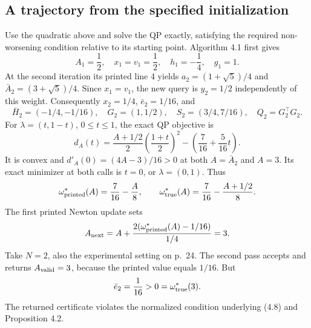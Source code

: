 \documentclass[10pt]{article}
\begin{document}
\subsection*{A trajectory from the specified initialization}
Use the quadratic above and solve the QP exactly, satisfying the required non-worsening condition relative to its starting point. Algorithm 4.1 first gives \[A_1=\frac12,\quad x_1=v_1=\frac12,\quad
 h_1=-\frac14,\quad g_1=1.\] At the second iteration its printed line 4 yields \(a_2=(1+\sqrt5)/4\) and \(\bar A_2=(3+\sqrt5)/4\). Since \(x_1=v_1\), the new query is \(y_2=1/2\) independently of this weight. Consequently \(x_2=1/4\), \(\bar e_2=1/16\), and \[\bar H_2=(-1/4,-1/16),\quad G_2=(1,1/2),\quad
 S_2=(3/4,7/16),\quad Q_2=G_2^\top G_2.\] For \(\lambda=(t,1-t)\), \(0\le t\le1\), the exact QP objective is \[d_A(t)=\frac{A+1/2}{2}\left(\frac{1+t}{2}\right)^2
            -\left(\frac7{16}+\frac5{16}t\right).\] It is convex and \(d'_A(0)=(4A-3)/16>0\) at both \(A=\bar A_2\) and \(A=3\). Its exact minimizer at both calls is \(t=0\), or \(\lambda=(0,1)\). Thus \[\omega_{\rm printed}^*(A)=\frac7{16}-\frac A8,\qquad
 \omega_{\rm true}^*(A)=\frac7{16}-\frac{A+1/2}{8}.\] The first printed Newton update sets \[A_{\rm next}
 =A+\frac{2(\omega_{\rm printed}^*(A)-1/16)}{1/4}=3.\] Take \(N=2\), also the experimental setting on p. 24. The second pass accepts and returns \(A_{\rm valid}=3\), because the printed value equals \(1/16\). But \[\bar e_2=\frac1{16}>0=\omega_{\rm true}^*(3).\] The returned certificate violates the normalized condition underlying (4.8) and Proposition 4.2.\par
\end{document}
